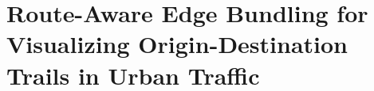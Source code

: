 \chapter{Route-Aware Edge Bundling for Visualizing Origin-Destination Trails in Urban Traffic}\label{chap:c1_intro}